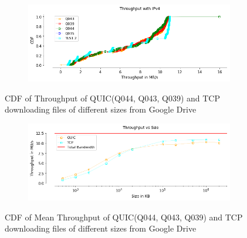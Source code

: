 \begin{frame}

\begin{figure}[!htb]
    \centering
    \begin{subfigure}{0.5\textwidth}
        \includegraphics[width=\linewidth]{./plots/PI/gdrive/Throughput_ipv4.png}
    \end{subfigure}   
    \caption{CDF of Throughput of QUIC(Q044, Q043, Q039) and TCP downloading files of different sizes from Google Drive}\label{fig:cdf-of-throughput}
\end{figure}

\begin{figure}[!htb]
    \centering
    \begin{subfigure}{0.5\textwidth}
        \includegraphics[width=\linewidth]{./plots/PI/gdrive/MeanThroughputvssize.png}
    \end{subfigure}   
    \caption{CDF of Mean Throughput of QUIC(Q044, Q043, Q039) and TCP downloading files of different sizes from Google Drive}\label{fig:cdf-of-mean}
\end{figure}


\end{frame}
\clearpage

